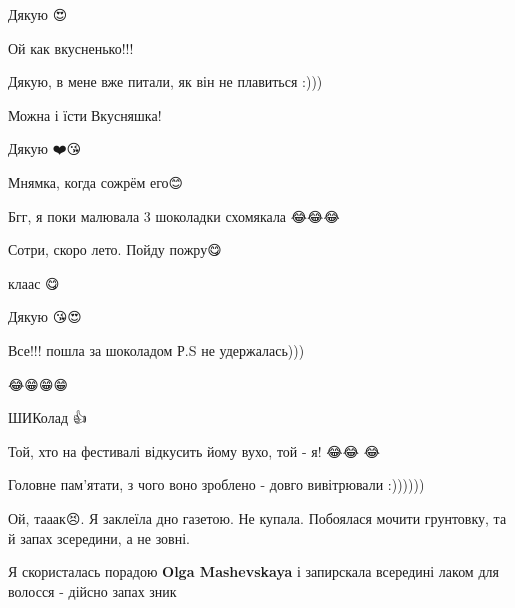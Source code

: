 \begin{itemize} %
Дякую 😍
\end{itemize} %


Ой как вкусненько!!!

\begin{itemize} %
Дякую, в мене вже питали, як він не плавиться :)))
\end{itemize} %


Можна і їсти🐰Вкусняшка!

\begin{itemize} %
Дякую ❤️😘
\end{itemize} %


Мнямка, когда сожрём его😊

\begin{itemize} %

Бгг, я поки малювала 3 шоколадки схомякала 😂😂😂


Сотри, скоро лето. Пойду пожру😋
\end{itemize} %


клаас 😋

\begin{itemize} %

Дякую 😘😍
\end{itemize} %


Все!!! пошла за шоколадом Р.S не удержалась)))

\begin{itemize} %
😂😁😁😁
\end{itemize} %


ШИКолад 👍


Той, хто на фестивалі відкусить йому вухо, той - я! 😂😂 😂

\begin{itemize} %

Головне пам'ятати, з чого воно зроблено - довго вивітрювали :))))))


Ой, тааак😣. Я заклеїла дно газетою. Не купала. Побоялася мочити грунтовку, та й запах зсередини, а не зовні.


Я скористалась порадою \textbf{Olga Mashevskaya} і запирскала всередині лаком для волосся - дійсно запах зник
\end{itemize} %

